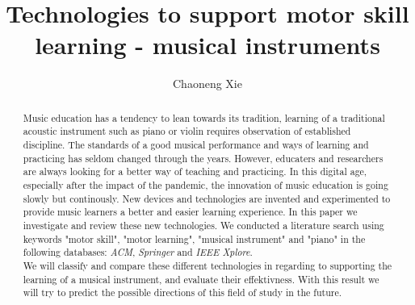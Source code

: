 \documentclass[sigconf]{acmart}
\begin{document}
\title{Technologies to support motor skill learning - musical instruments}

\author{Chaoneng Xie}



\begin{abstract}
  Music education has a tendency to lean towards its tradition, learning of a traditional acoustic instrument such as piano or violin requires observation of established discipline. The standards of a good musical performance and ways of learning and practicing has seldom changed through the years. However, educaters and researchers are always looking for a better way of teaching and practicing. In this digital age, especially after the impact of the pandemic, the innovation of music education is going slowly but continously. New devices and technologies are invented and experimented to provide music learners a better and easier learning experience. In this paper we investigate and review these new technologies. We conducted a literature search using keywords "motor skill", "motor learning", "musical instrument" and "piano" in the following databases: \textit{ACM}, \textit{Springer} and \textit{IEEE Xplore}.\\

  We will classify and compare these different technologies in regarding to supporting the learning of a musical instrument, and evaluate their effektivness. With this result we will try to predict the possible directions of this field of study in the future.\\
\end{abstract}
\end{document}
